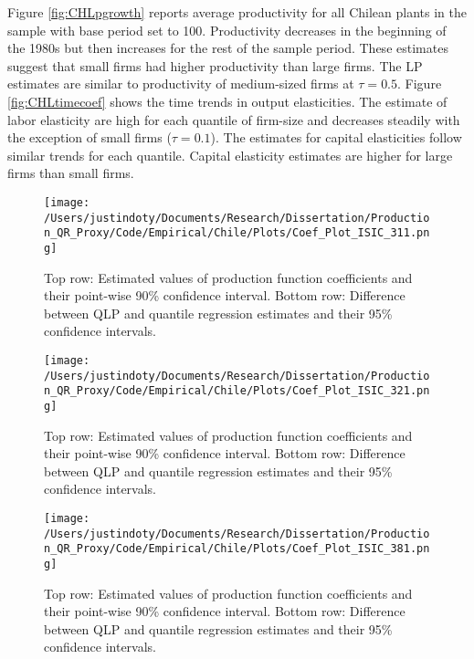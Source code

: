 \documentclass[11pt]{article}
\begin{document}
Figure \ref{fig:CHLpgrowth} reports average productivity for all Chilean plants in the sample with base period set to 100. Productivity decreases in the beginning of the 1980s but then increases for the rest of the sample period. These estimates suggest that small firms had higher productivity than large firms. The LP estimates are similar to productivity of medium-sized firms at $\tau=0.5$. Figure \ref{fig:CHLtimecoef} shows the time trends in output elasticities. The estimate of labor elasticity are high for each quantile of firm-size and decreases steadily with the exception of small firms ($\tau=0.1$). The estimates for capital elasticities follow similar trends for each quantile. Capital elasticity estimates are higher for large firms than small firms.


  

\begin{figure}[H]
\centering
\texttt{[image: /Users/justindoty/Documents/Research/Dissertation/Production\_QR\_Proxy/Code/Empirical/Chile/Plots/Coef\_Plot\_ISIC\_311.png]}
\caption{Top row: Estimated values of production function coefficients and their point-wise 90\% confidence interval. Bottom row: Difference between QLP and quantile regression estimates and their 95\% confidence intervals.}
\label{fig:CHL311}
\end{figure}

\begin{figure}[H]
\centering
\texttt{[image: /Users/justindoty/Documents/Research/Dissertation/Production\_QR\_Proxy/Code/Empirical/Chile/Plots/Coef\_Plot\_ISIC\_321.png]}
\caption{Top row: Estimated values of production function coefficients and their point-wise 90\% confidence interval. Bottom row: Difference between QLP and quantile regression estimates and their 95\% confidence intervals.}
\label{fig:CHL321}
\end{figure}

\begin{figure}[H]
\centering
\texttt{[image: /Users/justindoty/Documents/Research/Dissertation/Production\_QR\_Proxy/Code/Empirical/Chile/Plots/Coef\_Plot\_ISIC\_381.png]}
\caption{Top row: Estimated values of production function coefficients and their point-wise 90\% confidence interval. Bottom row: Difference between QLP and quantile regression estimates and their 95\% confidence intervals.}
\label{fig:CHL381}
\end{figure}
\end{document}
